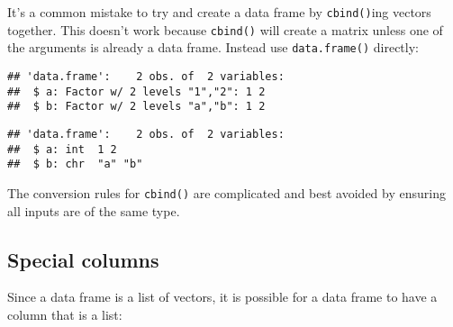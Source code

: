 It's a common mistake to try and create a data frame by
\texttt{cbind()}ing vectors together. This doesn't work because
\texttt{cbind()} will create a matrix unless one of the arguments is
already a data frame. Instead use \texttt{data.frame()} directly:

\begin{Shaded}
\begin{Highlighting}[]
\StringTok{ }\NormalTok{(}\NormalTok{(} \OperatorTok{:}\NormalTok{, } \NormalTok{(}\NormalTok{, }\NormalTok{)))}
\end{Highlighting}
\end{Shaded}

\begin{verbatim}
## 'data.frame':    2 obs. of  2 variables:
##  $ a: Factor w/ 2 levels "1","2": 1 2
##  $ b: Factor w/ 2 levels "a","b": 1 2
\end{verbatim}

\begin{Shaded}
\begin{Highlighting}[]
\StringTok{ }\NormalTok{(} \OperatorTok{:}\NormalTok{, } \NormalTok{(}\NormalTok{, }\NormalTok{),}
   \NormalTok{)}
\end{Highlighting}
\end{Shaded}

\begin{verbatim}
## 'data.frame':    2 obs. of  2 variables:
##  $ a: int  1 2
##  $ b: chr  "a" "b"
\end{verbatim}

The conversion rules for \texttt{cbind()} are complicated and best
avoided by ensuring all inputs are of the same type.

\hypertarget{special-columns}{%
\subsection{Special columns}\label{special-columns}}

Since a data frame is a list of vectors, it is possible for a data frame
to have a column that is a list: 

